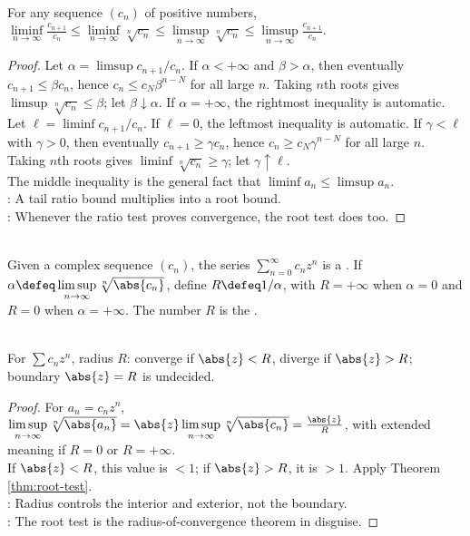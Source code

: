 \begin{theorem} \label{thm:root-test-dominates-ratio-test} \\
For any sequence $(c_n)$ of positive numbers, $\liminf\limits_{n\to\infty}\frac{c_{n+1}}{c_n}\leq \liminf\limits_{n\to\infty}\sqrt[n]{c_n} \leq \limsup\limits_{n\to\infty}\sqrt[n]{c_n}\leq \limsup\limits_{n\to\infty}\frac{c_{n+1}}{c_n}$.
\begin{proof}
Let $\alpha=\limsup c_{n+1}/c_n$. If $\alpha<+\infty$ and $\beta>\alpha$, then eventually $c_{n+1}\leq\beta c_n$, hence $c_n\leq c_N\beta^{n-N}$ for all large $n$. Taking $n$th roots gives $\limsup\sqrt[n]{c_n}\leq\beta$; let $\beta\downarrow\alpha$. If $\alpha=+\infty$, the rightmost inequality is automatic.\\
Let $\ell=\liminf c_{n+1}/c_n$. If $\ell=0$, the leftmost inequality is automatic. If $\gamma<\ell$ with $\gamma>0$, then eventually $c_{n+1}\geq\gamma c_n$, hence $c_n\geq c_N\gamma^{n-N}$ for all large $n$. Taking $n$th roots gives $\liminf\sqrt[n]{c_n}\geq\gamma$; let $\gamma\uparrow\ell$.\\
The middle inequality is the general fact that $\liminf a_n\leq\limsup a_n$.\\
: A tail ratio bound multiplies into a root bound.\\
: Whenever the ratio test proves convergence, the root test does too.
\end{proof}
\end{theorem}

\begin{definition} \label{def:power-series-radius-basic} \\
Given a complex sequence $(c_n)$, the series $\sum\limits_{n=0}^{\infty}c_nz^n$ is a . If $\alpha\defeq\limsup\limits_{n\to\infty}\sqrt[n]{\abs{c_n}}$, define $R\defeq1/\alpha$, with $R=+\infty$ when $\alpha=0$ and $R=0$ when $\alpha=+\infty$. The number $R$ is the .
\end{definition}

\begin{theorem} \label{thm:power-series-radius-convergence} \\
For $\sum c_nz^n$, radius $R$: converge if $\abs{z}<R$, diverge if $\abs{z}>R$; boundary $\abs{z}=R$ is undecided.
\begin{proof}
For $a_n=c_nz^n$, $\limsup\limits_{n\to\infty}\sqrt[n]{\abs{a_n}}=\abs{z}\limsup\limits_{n\to\infty}\sqrt[n]{\abs{c_n}}=\frac{\abs{z}}{R}$, with extended meaning if $R=0$ or $R=+\infty$.\\
If $\abs{z}<R$, this value is $<1$; if $\abs{z}>R$, it is $>1$. Apply Theorem \ref{thm:root-test}.\\
: Radius controls the interior and exterior, not the boundary.\\
: The root test is the radius-of-convergence theorem in disguise.
\end{proof}
\end{theorem}

